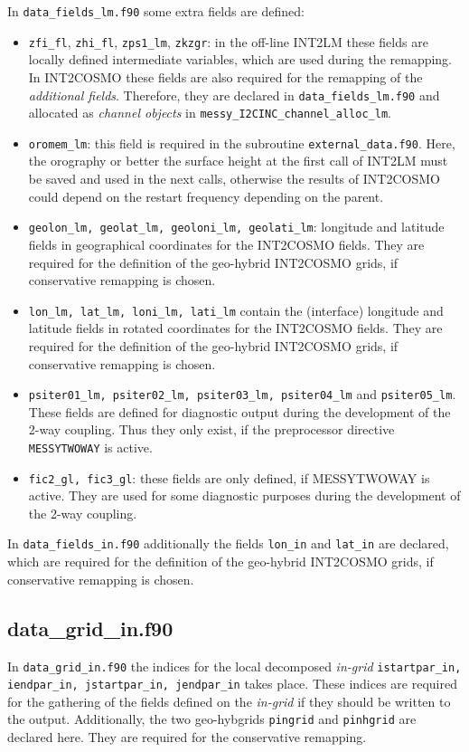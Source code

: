 \documentclass[11pt,twoside]{article}
\begin{document}
In \verb|data_fields_lm.f90| some extra fields are defined:
\begin{itemize}
\item  \verb|zfi_fl|, \verb|zhi_fl|, \verb|zps1_lm|,
 \verb|zkzgr|: in the off-line 
 INT2LM these fields are locally defined intermediate variables, which are
used during the remapping. In INT2COSMO these fields are also 
 required for the remapping of the {\it additional fields}. 
Therefore, they are declared in \verb|data_fields_lm.f90| and allocated as
 {\it channel objects} in \verb|messy_I2CINC_channel_alloc_lm|.
\item \verb|oromem_lm|: this field is required in the subroutine 
\verb|external_data.f90|. Here,
 the orography or better the surface height at the first call of
 INT2LM must be saved and used in 
 the next calls, otherwise the results of INT2COSMO could depend on the restart
 frequency depending on the parent.
\item \verb|geolon_lm, geolat_lm, geoloni_lm, geolati_lm|: 
longitude and latitude fields in geographical coordinates
 for the INT2COSMO fields. They are required for the definition of
 the geo-hybrid INT2COSMO grids, if conservative remapping is chosen.
\item \verb|lon_lm, lat_lm, loni_lm, lati_lm| contain
 the (interface) longitude and latitude fields in rotated coordinates
 for the INT2COSMO fields. They are required for the definition of
 the geo-hybrid INT2COSMO grids, if conservative remapping is chosen.
\item \verb|psiter01_lm, psiter02_lm, psiter03_lm, psiter04_lm|
and \verb|psiter05_lm|. These fields are defined for diagnostic output
during the development of the 2-way coupling. Thus they only exist, if
the preprocessor directive  { \tt \large MESSYTWOWAY} is active.

\item \verb|fic2_gl, fic3_gl|: these fields are only defined, if
 MESSYTWOWAY is active. They are used for some diagnostic purposes
 during the development of the 2-way coupling.
\end{itemize}

In \verb|data_fields_in.f90| additionally the fields \verb|lon_in|
and \verb|lat_in| are declared, which are required for the definition of
 the geo-hybrid INT2COSMO grids, if conservative remapping is chosen.

\subsection{data\_grid\_in.f90}
In \verb|data_grid_in.f90| the indices for the local decomposed
{\it in-grid} \verb|istartpar_in, iendpar_in, jstartpar_in, jendpar_in|
takes place. These indices are required for the gathering of the
fields defined on the {\it in-grid} if they should be written to the output.
Additionally, the two geo-hybgrids \verb|pingrid| and \verb|pinhgrid|
are declared here. They are required for the conservative remapping.
\end{document}
